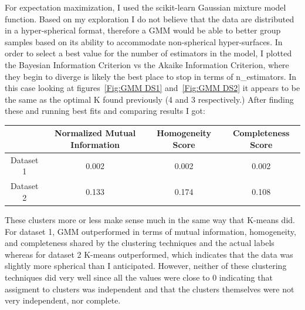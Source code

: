 For expectation maximization, I used the scikit-learn Gaussian mixture model function.
Based on my exploration I do not believe that the data are distributed in a hyper-spherical format, therefore a GMM would
be able to better group samples based on its ability to accommodate non-spherical hyper-surfaces.
In order to select a best value for the number of estimators in the model, I plotted the Bayesian Information Criterion
vs the Akaike Information Criterion, where they begin to diverge is likely the best place to stop in terms of n\_estimators.
In this case looking at figures~\ref{Fig:GMM DS1} and~\ref{Fig:GMM DS2} it appears to be the same as the optimal K found
previously (4 and 3 respectively.) After finding these and running best fits and comparing results I got:
\begin{center}
    \begin{tabular}{|c| c | c | c |}
        \hline
        & Normalized Mutual Information & Homogeneity Score & Completeness Score \\
        \hline
        \hline
        Dataset 1 & 0.002                         & 0.002             & 0.002              \\
        \hline
        Dataset 2 & 0.133                         & 0.174             & 0.108              \\
        \hline
    \end{tabular}
\end{center}
These clusters more or less make sense much in the same way that K-means did.
For dataset 1, GMM outperformed in terms of mutual information, homogeneity, and completeness shared by the clustering techniques and the actual labels
whereas for dataset 2 K-means outperformed, which indicates that the data was slightly more spherical than I anticipated.
However, neither of these clustering techniques did very well since all the values were close to 0 indicating that assigment
to clusters was independent and that the clusters themselves were not very independent, nor complete.
